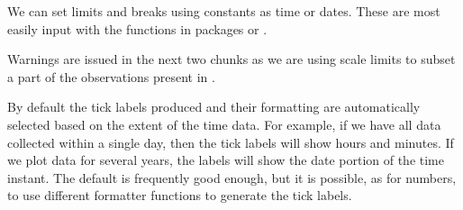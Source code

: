 \documentclass[krantz2]{krantz}\usepackage{knitr}
\begin{document}
We can set limits and breaks using constants as time or dates. These are most easily input with the functions in packages  or .


\begin{warningbox}
Warnings are issued in the next two chunks as we are using scale limits to subset a part of the observations present in .
\end{warningbox}

\begin{knitrout}\footnotesize
{}\color{fgcolor}\begin{kframe}
\begin{alltt}
\hlstd{(} 
       \hlstd{(}  \hlstd{=}  \hlopt{+}
  \hlstd{()} \hlopt{+}
  \hlstd{(} \hlstd{=} \hlstd{,}
                    \hlstd{=} \hlstd{(}\hlstd{,}  \hlstd{=} \hlstd{)} \hlopt{+} \hlstd{(}\hlopt{:}\hlstd{),}
                    \hlstd{=} \hlstd{(}\hlstd{,}  \hlstd{=} \hlstd{)} \hlopt{+} \hlstd{(}\hlstd{(}\hlstd{,} \hlstd{)))} \hlopt{+}
  \hlstd{(} \hlstd{=} \hlstd{)} \hlopt{+}
  \hlstd{(} \hlstd{=} \hlstd{)}
\end{alltt}


{\ttfamily\noindent\bfseries{}}\end{kframe}
\end{knitrout}

By default the tick labels produced and their formatting are automatically selected based on the extent of the time data. For example, if we have all data collected within a single day, then the tick labels will show hours and minutes. If we plot data for several years, the labels will show the date portion of the time instant. The default is frequently good enough, but it is possible, as for numbers, to use different formatter functions to generate the tick labels.
\end{document}

